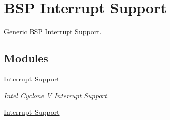 \hypertarget{group__bsp__interrupt}{}\section{B\+SP Interrupt Support}
\label{group__bsp__interrupt}


Generic B\+SP Interrupt Support.  


\subsection*{Modules}
\begin{DoxyCompactItemize}
\item 
\mbox{\hyperlink{group__RTEMSBSPsARMCycVIRQ}{Interrupt Support}}
\begin{DoxyCompactList}\small\item\em Intel Cyclone V Interrupt Support. \end{DoxyCompactList}\item 
\mbox{\hyperlink{group__lpc32xx__interrupt}{Interrupt Support}}
\end{DoxyCompactItemize}
